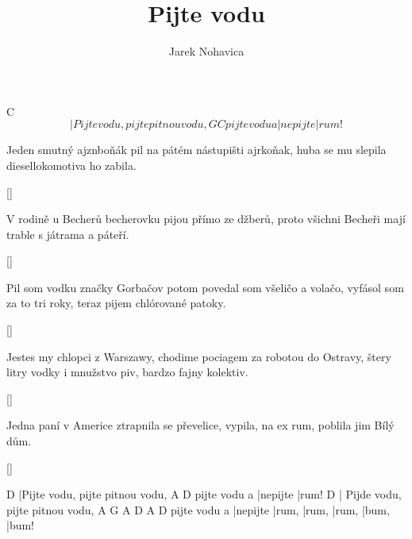\documentclass{song}
\title{Pijte vodu}
\author{Jarek Nohavica}
\begin{document}
   C
\[ |Pijte vodu, pijte pitnou vodu,
             G        C
pijte vodu a |nepijte |rum! \]
\endstrophe

\strophe*
Jeden smutný ajznboňák
pil na pátém nástupišti ajrkoňak,
huba se mu slepila
diesellokomotiva ho zabila.
\endstrophe

\ref{}

\strophe*
V rodině u Becherů
becherovku pijou přímo ze džberů,
proto všichni Becheři
mají trable s játrama a páteří.
\endstrophe

\ref{}

\strophe*
Pil som vodku značky Gorbačov
potom povedal som všeličo a volačo,
vyfásol som za to tri roky,
teraz pijem chlórované patoky.
\endstrophe

\ref{}

\strophe*
Jestes my chlopci z Warszawy,
chodime pociagem za robotou do Ostravy,
štery litry vodky i mnužstvo piv,
bardzo fajny kolektiv.
\endstrophe

\ref{}

\strophe*
Jedna paní v Americe
ztrapnila se převelice,
vypila, na ex rum,
poblila jim Bílý dům.
\endstrophe

\ref{}

D
|Pijte vodu, pijte pitnou vodu,
             A        D
pijte vodu a |nepijte |rum!
D
| Pijde vodu, pijte pitnou vodu,
             A        G     A     D     A     D
pijte vodu a |nepijte |rum, |rum, |rum, |bum, |bum!
\endstrophe
\end{document}

